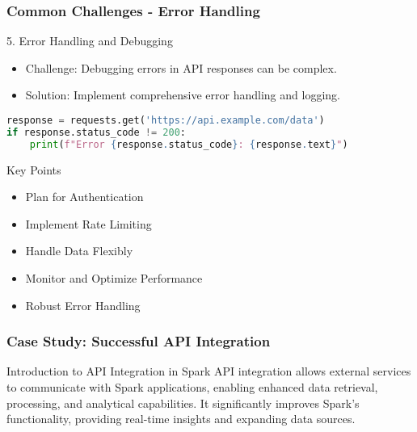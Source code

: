 \documentclass[aspectratio=169]{beamer}
\begin{document}
\begin{frame}[fragile]
    \frametitle{Common Challenges - Error Handling}
    \begin{block}{5. Error Handling and Debugging}
        \begin{itemize}
            \item Challenge: Debugging errors in API responses can be complex.
            \item Solution: Implement comprehensive error handling and logging.
        \end{itemize}
        \begin{lstlisting}[language=Python]
response = requests.get('https://api.example.com/data')
if response.status_code != 200:
    print(f"Error {response.status_code}: {response.text}")
        \end{lstlisting}
    \end{block}

    \begin{block}{Key Points}
        \begin{itemize}
            \item Plan for Authentication
            \item Implement Rate Limiting
            \item Handle Data Flexibly
            \item Monitor and Optimize Performance
            \item Robust Error Handling
        \end{itemize}
    \end{block}
\end{frame}

\begin{frame}[fragile]
    \frametitle{Case Study: Successful API Integration}
    \begin{block}{Introduction to API Integration in Spark}
        API integration allows external services to communicate with Spark applications, enabling enhanced data retrieval, processing, and analytical capabilities. It significantly improves Spark's functionality, providing real-time insights and expanding data sources.
    \end{block}
\end{frame}
\end{document}
